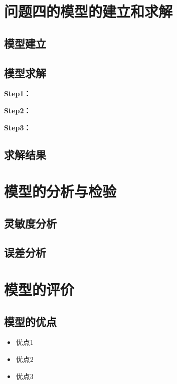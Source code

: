\documentclass[withoutpreface,bwprint]{cumcmthesis}
\begin{document}

\section{问题四的模型的建立和求解}
\subsection{模型建立}

\subsection{模型求解}

\textbf{Step1：} 

\textbf{Step2：} 

\textbf{Step3：} 

\subsection{求解结果}


\section{模型的分析与检验}

\subsection{灵敏度分析}

\subsection{误差分析}


\section{模型的评价}

\subsection{模型的优点}
\begin{itemize}[itemindent=2em]
\item 优点1
\item 优点2
\item 优点3
\end{itemize}
\end{document}
